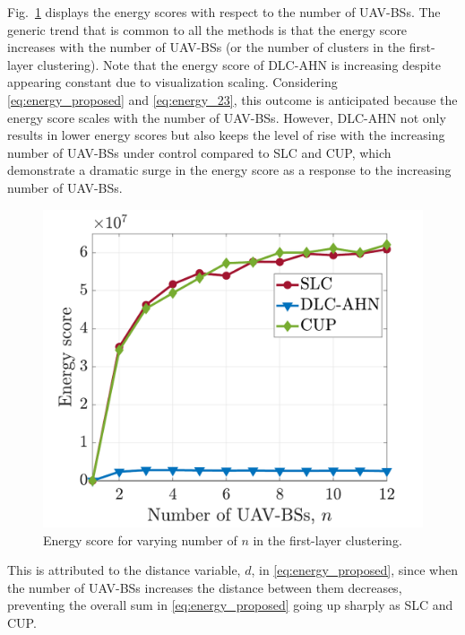 \documentclass[conference, a4paper]{IEEEtran}
\begin{document}
Fig.~\ref{fig:energy2} displays the energy scores with respect to the number of UAV-BSs.
The generic trend that is common to all the methods is that the energy score increases with the number of UAV-BSs (or the number of clusters in the first-layer clustering).
Note that the energy score of DLC-AHN is increasing despite appearing constant due to visualization scaling.
Considering \eqref{eq:energy_proposed} and \eqref{eq:energy_23}, this outcome is anticipated because the energy score scales with the number of UAV-BSs.
However, DLC-AHN not only results in lower energy scores but also keeps the level of rise with the increasing number of UAV-BSs under control compared to SLC and CUP, which demonstrate a dramatic surge in the energy score as a response to the increasing number of UAV-BSs. 
\begin{figure}[t!]
    \centering
     \shorthandoff{=}
    \includegraphics[width=.74\linewidth]{Figures/Energy2-eps-converted-to.pdf}
    \shorthandoff{=}
    \caption{Energy score for varying number of $n$ in the first-layer clustering.}
    \label{fig:energy2}
\end{figure}
This is attributed to the distance variable, $d$, in \eqref{eq:energy_proposed}, since when the number of UAV-BSs increases the distance between them decreases, preventing the overall sum in \eqref{eq:energy_proposed} going up sharply as SLC and CUP. 
\end{document}
